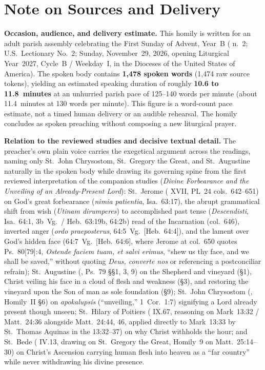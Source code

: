 \section*{Note on Sources and Delivery}

\noindent\textbf{Occasion, audience, and delivery estimate.}
This homily is written for an adult parish assembly celebrating the First Sunday of Advent, Year~B ( n.~2; U.S.\ Lectionary No.~2; Sunday, November~29, 2026, opening Liturgical Year~2027, Cycle~B / Weekday~I, in the Dioceses of the United States of America). The spoken body contains \textbf{1,478 spoken words} (1,474 raw source tokens), yielding an estimated speaking duration of roughly \textbf{10.6 to 11.8~minutes} at an unhurried parish pace of 125--140 words per minute (about 11.4~minutes at 130 words per minute). This figure is a word-count pace estimate, not a timed human delivery or an audible rehearsal. The homily concludes as spoken preaching without composing a new liturgical prayer.

\medskip
\noindent\textbf{Relation to the reviewed studies and decisive textual detail.}
The preacher's own plain voice carries the exegetical argument across the readings, naming only St.~John Chrysostom, St.~Gregory the Great, and St.~Augustine naturally in the spoken body while drawing its governing spine from the first reviewed interpretation of the companion studies (\emph{Divine Forbearance and the Unveiling of an Already-Present Lord}): St.~Jerome ( XVII, PL~24 cols.~642--651) on God's great forbearance (\emph{nimia patientia}, Isa.~63:17), the abrupt grammatical shift from wish (\emph{Utinam dirumperes}) to accomplished past tense (\emph{Descendisti}, Isa.~64:1, 3b~Vg.\ / Heb.~63:19b, 64:2b) read of the Incarnation (col.~646), inverted anger (\emph{ordo praeposterus}, 64:5~Vg.\ [Heb.~64:4]), and the lament over God's hidden face (64:7~Vg.\ [Heb.~64:6], where Jerome at col.~650 quotes Ps.~80[79]:4, \emph{Ostende faciem tuam, et salvi erimus}, ``shew us thy face, and we shall be saved,'' without quoting \emph{Deus, converte nos} or referencing a postconciliar refrain); St.~Augustine (, Ps.~79 §§1, 3, 9) on the Shepherd and vineyard (§1), Christ veiling his face in a cloud of flesh and weakness (§3), and restoring the vineyard upon the Son of man as sole foundation (§9); St.~John Chrysostom (, Homily~II §6) on \emph{apokalupsis} (``unveiling,'' 1~Cor.~1:7) signifying a Lord already present though unseen; St.~Hilary of Poitiers ( IX.67, reasoning on Mark~13:32 / Matt.~24:36 alongside Matt.~24:44, 46, applied directly to Mark~13:33 by St.~Thomas Aquinas in the  13:32--37) on why Christ withholds the hour; and St.~Bede ( IV.13, drawing on St.~Gregory the Great,  Homily~9 on Matt.~25:14--30) on Christ's Ascension carrying human flesh into heaven as a ``far country'' while never withdrawing his divine presence.

